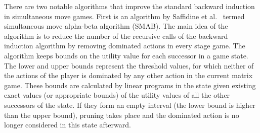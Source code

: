 There are two notable algorithms that improve the standard backward induction in simultaneous move games. 
First is an algorithm by Saffidine et al.~\cite{Saffidine12SMAB} termed simultaneous move alpha-beta algorithm (SMAB). 
The main idea of the algorithm is to reduce the number of the recursive calls of the backward induction
algorithm by removing dominated actions in every stage game. The algorithm keeps bounds on the utility value for each successor in a game state. 
The lower and upper bounds represent the threshold values, for which neither of the actions of the player is dominated by any other action in the current matrix game. These bounds are calculated by linear programs in the state given existing exact values (or appropriate bounds) of the utility values of all the other successors of the state. If they form an empty interval (the lower bound is higher than the upper bound), pruning takes place and the dominated action is no longer considered in this state afterward. 



